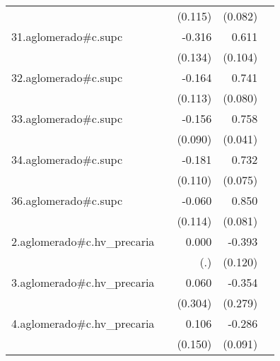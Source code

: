 {\begin{longtable}{l*{4}{D{.}{.}{-1}}}
            &                     &     (0.115)         &     (0.082)         &                     \\
\addlinespace
31.aglomerado#c.supc&                     &      -0.316\sym{*}  &       0.611\sym{***}&                     \\
            &                     &     (0.134)         &     (0.104)         &                     \\
\addlinespace
32.aglomerado#c.supc&                     &      -0.164         &       0.741\sym{***}&                     \\
            &                     &     (0.113)         &     (0.080)         &                     \\
\addlinespace
33.aglomerado#c.supc&                     &      -0.156         &       0.758\sym{***}&                     \\
            &                     &     (0.090)         &     (0.041)         &                     \\
\addlinespace
34.aglomerado#c.supc&                     &      -0.181         &       0.732\sym{***}&                     \\
            &                     &     (0.110)         &     (0.075)         &                     \\
\addlinespace
36.aglomerado#c.supc&                     &      -0.060         &       0.850\sym{***}&                     \\
            &                     &     (0.114)         &     (0.081)         &                     \\
\addlinespace
2.aglomerado#c.hv\_precaria&                     &       0.000         &      -0.393\sym{**} &                     \\
            &                     &         (.)         &     (0.120)         &                     \\
\addlinespace
3.aglomerado#c.hv\_precaria&                     &       0.060         &      -0.354         &                     \\
            &                     &     (0.304)         &     (0.279)         &                     \\
\addlinespace
4.aglomerado#c.hv\_precaria&                     &       0.106         &      -0.286\sym{**} &                     \\
            &                     &     (0.150)         &     (0.091)         &                     \\

\end{longtable}}

